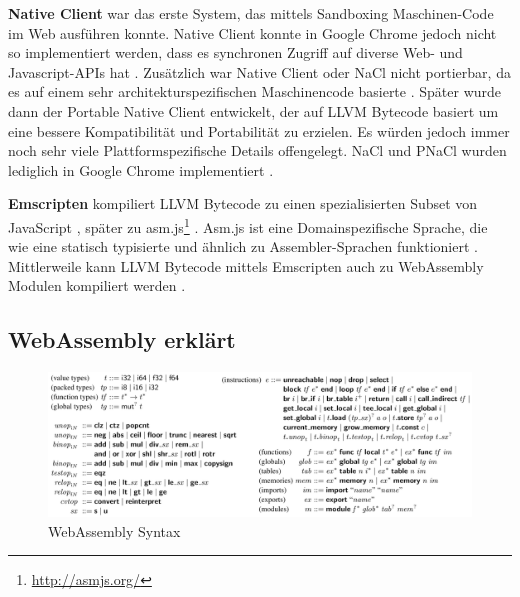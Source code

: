 \begin{flushleft}

\textbf{Native Client} \autocite[]{Yee2010} war das erste System, das mittels Sandboxing Maschinen-Code im Web ausführen konnte. Native Client konnte in Google Chrome jedoch nicht so implementiert werden, dass es synchronen Zugriff auf diverse Web- und Javascript-APIs hat \autocite[p.~186]{Haas2017}. Zusätzlich war Native Client oder NaCl nicht portierbar, da es auf einem sehr architekturspezifischen Maschinencode basierte \autocite[p.~186]{Haas2017}. Später wurde dann der Portable Native Client \autocite[]{Donovan2010} entwickelt, der auf LLVM Bytecode basiert um eine bessere Kompatibilität und Portabilität zu erzielen. Es würden jedoch immer noch sehr viele Plattformspezifische Details offengelegt. NaCl und PNaCl wurden lediglich in Google Chrome implementiert \autocite[p.~186]{Haas2017}. 

\hfill \break

\textbf{Emscripten} kompiliert LLVM Bytecode zu einen spezialisierten Subset von JavaScript \autocite[]{Zakai2011}, später zu asm.js\footnote{\url{http://asmjs.org/}} \autocite[p.~186]{Haas2017}. Asm.js ist eine Domainspezifische Sprache, die wie eine statisch typisierte und ähnlich zu Assembler-Sprachen funktioniert \autocite[p.~186]{Haas2017}. Mittlerweile kann LLVM Bytecode mittels Emscripten auch zu WebAssembly Modulen kompiliert werden \autocite[]{Emscripten}.

\end{flushleft}


\subsection{WebAssembly erklärt}

\begin{figure}[t]
	\centering
	\includegraphics[width=1\textwidth]{images/WebAssemblySyntax.png}
	\caption{
		WebAssembly Syntax \autocite[p.~187]{Haas2017}
	}
	\label{figure:WASyntax}
\end{figure}

